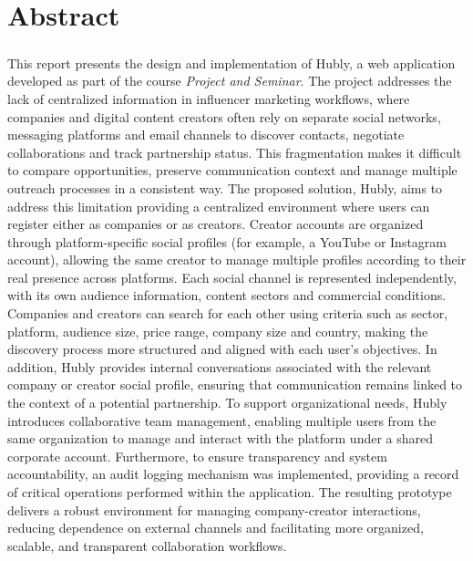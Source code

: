 \chapter*{Abstract}
\paragraph{}This report presents the design and implementation of Hubly, a web application developed as part of the course \textit{Project and Seminar}. The project addresses the lack of centralized information in influencer marketing workflows, where companies and digital content creators often rely on separate social networks, messaging platforms and email channels to discover contacts, negotiate collaborations and track partnership status. This fragmentation makes it difficult to compare opportunities, preserve communication context and manage multiple outreach processes in a consistent way. The proposed solution, Hubly, aims to address this limitation providing a centralized environment where users can register either as companies or as creators. Creator accounts are organized through platform-specific social profiles (for example, a YouTube or Instagram account), allowing the same creator to manage multiple profiles according to their real presence across platforms. Each social channel is represented independently, with its own audience information, content sectors and commercial conditions. Companies and creators can search for each other using criteria such as sector, platform, audience size, price range, company size and country, making the discovery process more structured and aligned with each user’s objectives. In addition, Hubly provides internal conversations associated with the relevant company or creator social profile, ensuring that communication remains linked to the context of a potential partnership. To support organizational needs, Hubly introduces collaborative team management, enabling multiple users from the same organization to manage and interact with the platform under a shared corporate account. Furthermore, to ensure transparency and system accountability, an audit logging mechanism was implemented, providing a record of critical operations performed within the application. The resulting prototype delivers a robust environment for managing company-creator interactions, reducing dependence on external channels and facilitating more organized, scalable, and transparent collaboration workflows.